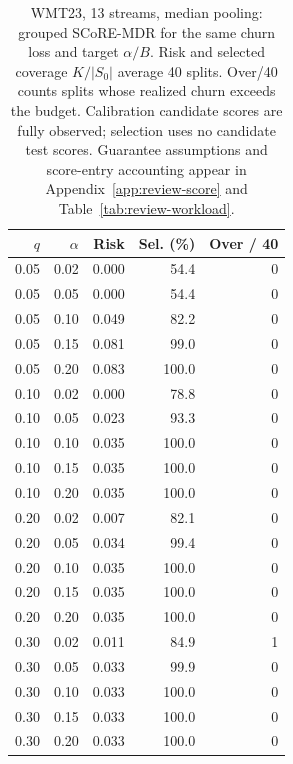 \begin{table}[t]
\centering\small
\begin{tabular}{rrrrr}
\toprule
$q$ & $\alpha$ & Risk & Sel. (\%) & Over / 40 \\
\midrule
0.05 & 0.02 & 0.000 & 54.4 & 0 \\
0.05 & 0.05 & 0.000 & 54.4 & 0 \\
0.05 & 0.10 & 0.049 & 82.2 & 0 \\
0.05 & 0.15 & 0.081 & 99.0 & 0 \\
0.05 & 0.20 & 0.083 & 100.0 & 0 \\
0.10 & 0.02 & 0.000 & 78.8 & 0 \\
0.10 & 0.05 & 0.023 & 93.3 & 0 \\
0.10 & 0.10 & 0.035 & 100.0 & 0 \\
0.10 & 0.15 & 0.035 & 100.0 & 0 \\
0.10 & 0.20 & 0.035 & 100.0 & 0 \\
0.20 & 0.02 & 0.007 & 82.1 & 0 \\
0.20 & 0.05 & 0.034 & 99.4 & 0 \\
0.20 & 0.10 & 0.035 & 100.0 & 0 \\
0.20 & 0.15 & 0.035 & 100.0 & 0 \\
0.20 & 0.20 & 0.035 & 100.0 & 0 \\
0.30 & 0.02 & 0.011 & 84.9 & 1 \\
0.30 & 0.05 & 0.033 & 99.9 & 0 \\
0.30 & 0.10 & 0.033 & 100.0 & 0 \\
0.30 & 0.15 & 0.033 & 100.0 & 0 \\
0.30 & 0.20 & 0.033 & 100.0 & 0 \\
\bottomrule
\end{tabular}
\caption{WMT23, 13 streams, median pooling: grouped SCoRE-MDR for the same churn loss and target $\alpha/B$. Risk and selected coverage $K/|S_0|$ average 40 splits. Over/40 counts splits whose realized churn exceeds the budget. Calibration candidate scores are fully observed; selection uses no candidate test scores. Guarantee assumptions and score-entry accounting appear in Appendix~\ref{app:review-score} and Table~\ref{tab:review-workload}.}
\label{tab:review-score-1-median}
\end{table}
